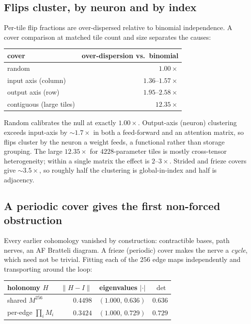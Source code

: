 \subsection{Flips cluster, by neuron and by index}
\label{sec:cluster}

Per-tile flip fractions are over-dispersed relative to binomial independence.
A cover comparison at matched tile count and size separates the causes:

\begin{center}
\begin{tabular}{lr}
\toprule
cover & over-dispersion vs.\ binomial \\
\midrule
random             & $\phantom{1}1.00\times$ \\
input axis (column)& $1.36$--$1.57\times$ \\
output axis (row)  & $1.95$--$2.58\times$ \\
contiguous (large tiles) & $12.35\times$ \\
\bottomrule
\end{tabular}
\end{center}

Random calibrates the null at exactly $1.00\times$. Output-axis (neuron)
clustering exceeds input-axis by $\sim\!1.7\times$ in both a feed-forward and an
attention matrix, so flips cluster by the neuron a weight feeds, a functional
rather than storage grouping. The large $12.35\times$ for $4228$-parameter tiles
is mostly cross-tensor heterogeneity; within a single matrix the effect is
$2$--$3\times$. Strided and frieze covers give $\sim\!3.5\times$, so roughly half
the clustering is global-in-index and half is adjacency.

\subsection{A periodic cover gives the first non-forced obstruction}
\label{sec:frieze}

Every earlier cohomology vanished by construction: contractible bases, path
nerves, an AF Bratteli diagram. A frieze (periodic) cover makes the nerve a
\emph{cycle}, which need not be trivial. Fitting each of the $256$ edge maps
independently and transporting around the loop:

\begin{center}
\begin{tabular}{lrrr}
\toprule
holonomy $H$ & $\|H-I\|$ & eigenvalues $|\cdot|$ & $\det$ \\
\midrule
shared $M^{256}$        & $0.4498$ & $(1.000,\,0.636)$ & $0.636$ \\
per-edge $\prod_i M_i$  & $0.3424$ & $(1.000,\,0.729)$ & $0.729$ \\
\bottomrule
\end{tabular}
\end{center}

